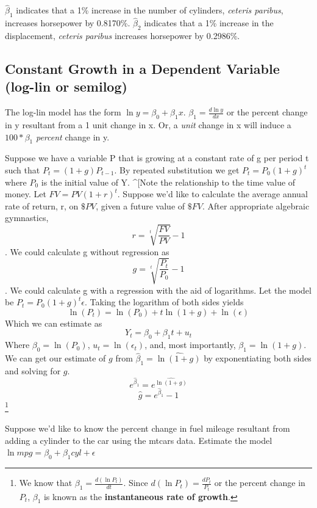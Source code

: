 \documentclass[]{book}
\newenvironment{Shaded}{\begin{snugshade}}{\end{snugshade}}
\newcommand{\KeywordTok}[1]{\textcolor[rgb]{0.13,0.29,0.53}{\textbf{#1}}}
\newcommand{\NormalTok}[1]{#1}
\newcommand{\OperatorTok}[1]{\textcolor[rgb]{0.81,0.36,0.00}{\textbf{#1}}}
\newcommand{\StringTok}[1]{\textcolor[rgb]{0.31,0.60,0.02}{#1}}
\let\rmarkdownfootnote\footnote%
\def\footnote{\protect\rmarkdownfootnote}
\begin{document}
\(\hat\beta_1\) indicates that a 1\% increase in the number of cylinders, \emph{ceteris paribus}, increases horsepower by 0.8170\%. \(\hat\beta_2\) indicates that a 1\% increase in the displacement, \emph{ceteris paribus} increases horsepower by 0.2986\%.

\hypertarget{constant-growth-in-a-dependent-variable-log-lin-or-semilog}{%
\subsection{Constant Growth in a Dependent Variable (log-lin or semilog)}\label{constant-growth-in-a-dependent-variable-log-lin-or-semilog}}

The log-lin model has the form \(\ln y = \beta_0 + \beta_1x\). \(\beta_1 = \frac{d\ln y}{dx}\) or the percent change in y resultant from a 1 unit change in x. Or, a \emph{unit} change in x will induce a \(100*\beta_1\) \emph{percent} change in y.

Suppose we have a variable P that is growing at a constant rate of g per period t such that \(P_t=(1+g)P_{t-1}\). By repeated substitution we get \(P_t=P_0(1+g)^t\) where \(P_0\) is the initial value of Y. \^{}{[}Note the relationship to the time value of money. Let \(FV=PV(1+r)^t\). Suppose we'd like to calculate the average annual rate of return, r, on \(\$PV\), given a future value of \(\$FV\). After appropriate algebraic gymnastics, \[r = \sqrt[t] { \frac{FV}{PV} } - 1\]. We could calculate g without regression as \[g=\sqrt[t]{ \frac{P_t}{P_0} }-1\]. We could calculate g with a regression with the aid of logarithms. Let the model be \(P_t=P_0(1+g)^t\epsilon\). Taking the logarithm of both sides yields \[\ln(P_t)=\ln(P_0)+t\ln(1+g)+\ln(\epsilon)\] Which we can estimate as \[Y_t=\beta_0+\beta_1t+u_t\] Where \(\beta_0=\ln(P_0)\), \(u_t = \ln(\epsilon_t)\), and, most importantly, \(\beta_1=\ln(1+g)\). We can get our estimate of \(g\) from \(\hat\beta_1=\widehat{\ln(1+g)}\) by exponentiating both sides and solving for \(g\). \[e^{\hat\beta_1}=e^{\widehat{\ln(1+g)}}\] \[\hat{g}=e^{\hat\beta_1}-1\] \footnote{We know that \(\beta_1=\frac{d(\ln P_t)}{dt}\). Since \(d(\ln P_t)=\frac{dP_t}{P_t}\) or the percent change in \(P_t\), \(\beta_1\) is known as the \textbf{instantaneous rate of growth}.}

Suppose we'd like to know the percent change in fuel mileage resultant from adding a cylinder to the car using the mtcars data. Estimate the model \(\ln mpg=\beta_0+\beta_1cyl+\epsilon\)

\begin{Shaded}
\end{Shaded}
\end{document}
